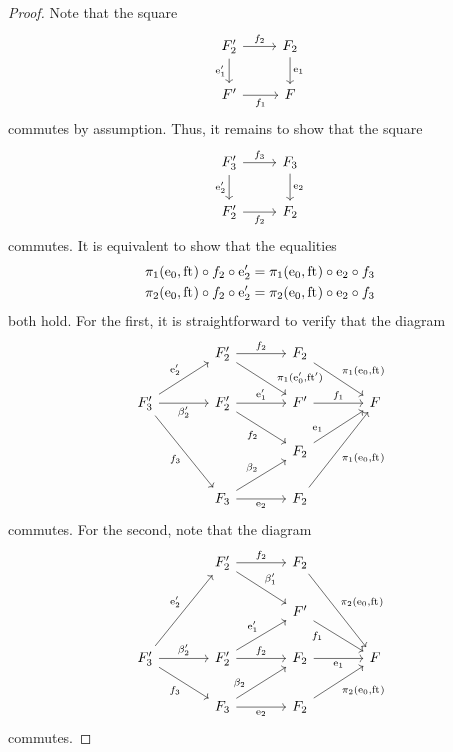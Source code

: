 \begin{proof}
Note that the square
\begin{equation*}
\begin{tikzcd}
\stesysf_2'
  \ar{r}{f_2}
  \ar{d}[swap]{\efamext'}
  &
\stesysf_2
  \ar{d}{\efamext}
  \\
\stesysf'
  \ar{r}[swap]{f_1}
  &
\stesysf
\end{tikzcd}
\end{equation*}
commutes by assumption. Thus, it remains to show that the square
\begin{equation*}
\begin{tikzcd}
\stesysf_3'
  \ar{r}{f_3}
  \ar{d}[swap]{\eext{2}'}
  &
\stesysf_3
  \ar{d}{\eext{2}}
  \\
\stesysf_2'
  \ar{r}[swap]{f_2}
  &
\stesysf_2
\end{tikzcd}
\end{equation*}
commutes. It is equivalent to show that the equalities
\begin{align*}
\pi_{1}(\mathrm{e}_{0},\mathrm{ft}_{})\circ f_2\circ\mathrm{e}_{2}'
  & =
\pi_{1}(\mathrm{e}_{0},\mathrm{ft}_{})\circ \mathrm{e}_{2}\circ f_3
  \\
\pi_{2}(\mathrm{e}_{0},\mathrm{ft}_{})\circ f_2\circ\mathrm{e}_{2}'
  & =
\pi_{2}(\mathrm{e}_{0},\mathrm{ft}_{})\circ \mathrm{e}_{2}\circ f_3
\end{align*}
both hold. For the first, it is straightforward to verify that the diagram
\begin{equation*}
\begin{tikzcd}[column sep=large]
{} &
\stesysf_2'
  \ar{r}{f_2}
  \ar{dr}[near end]{\pullbackpr{1}{\ectxext'}{\eft'}}
  &
\stesysf_2
  \ar{dr}{\pullbackpr{1}{\ectxext}{\eft}}
  \\
\stesysf_3'
  \ar{ur}{\eext{2}'}
  \ar{r}[swap]{\beta_2'}
  \ar{ddr}[swap]{f_3}
  &
\stesysf_2'
  \ar{r}{\efamext'}
  \ar{dr}[swap]{f_2}
  &
\stesysf'
  \ar{r}{f_1}
  &
\stesysf
  \\
{} & {} &
\stesysf_2
  \ar{ur}[near start]{\efamext}
  \\
{} &
\stesysf_3
  \ar{r}[swap]{\eext{2}}
  \ar{ur}{\beta_2}
  &
\stesysf_2
  \ar{uur}[swap]{\pullbackpr{1}{\ectxext}{\eft}}
\end{tikzcd}
\end{equation*}
commutes. For the second, note that the diagram
\begin{equation*}
\begin{tikzcd}[column sep=large]
{} &
\stesysf_2'
  \ar{r}{f_2}
  \ar{dr}{\beta_1'}
  &
\stesysf_2
  \ar{ddr}{\pullbackpr{2}{\ectxext}{\eft}}
  \\
{} & {} &
\stesysf'
  \ar{dr}[swap,near start]{f_1}
  \\
\stesysf_3'
  \ar{uur}{\eext{2}'}
  \ar{r}{\beta_2'}
  \ar{dr}[swap]{f_3}
  &
\stesysf_2'
  \ar{r}{f_2}
  \ar{ur}{\efamext'}
  &
\stesysf_2
  \ar{r}[swap]{\efamext}
  &
\stesysf
  \\
{} &
\stesysf_3
  \ar{r}[swap]{\eext{2}}
  \ar{ur}[near start]{\beta_2}
  &
\stesysf_2
  \ar{ur}[swap]{\pullbackpr{2}{\ectxext}{\eft}}
\end{tikzcd}
\end{equation*}
commutes.
\end{proof}

